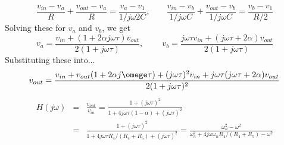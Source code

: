 \[
\frac{v_{in}-v_a}{R}+\frac{v_{out}-v_a}{R}=\frac{v_a-v_1}{1/j\omega 2C},
\;\;\;\;\;\;\;
\frac{v_{in}-v_b}{1/j\omega C}+\frac{v_{out}-v_b}{1/j\omega C}=\frac{v_b-v_1}{R/2}
\]
Solving these for $v_a$ and $v_b$, we get
\[
v_a=\frac{v_{in}+(1+2\alpha j\omega\tau)v_{out}}{2(1+j\omega\tau)},
\;\;\;\;\;\;\;\;
v_b=\frac{j\omega\tau v_{in}+(j\omega\tau+2\alpha)v_{out}}{2(1+j\omega\tau)}
\]
Substituting these into... 
\[
v_{out}=\frac{v_{in}+v_{out}(1+2\alpha j\omege\tau)
  +(j\omega\tau)^2v_{in}+j\omega\tau(j\omega\tau+2\alpha)v_{out}}{2(1+j\omega\tau)^2}
\]
\begin{eqnarray}
H(j\omega)&=&\frac{v_{out}}{v_{in}}=\frac{1+(j\omega\tau)^2}{1+4j\omega\tau(1-\alpha)+(j\omega\tau)^2}
\nonumber\\
&=&\frac{1+(j\omega\tau)^2}{1+4j\omega\tau R_4/(R_4+R_5)+(j\omega\tau)^2}
=\frac{\omega_n^2-\omega^2}{\omega_n^2+4j\omega\omega_n R_4/(R_4+R_5)-\omega^2}
\nonumber
\end{eqnarray}


